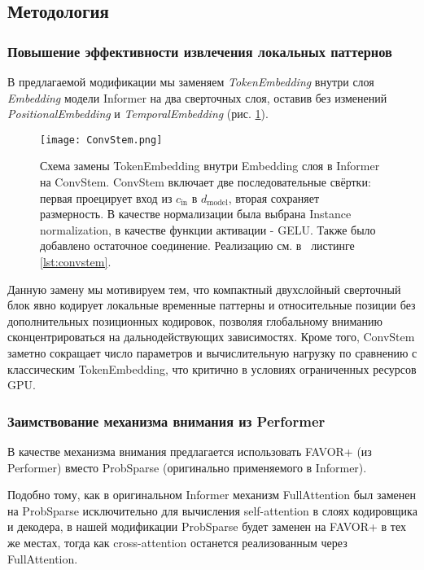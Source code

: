 \subsection{Методология}


\subsubsection{Повышение эффективности извлечения локальных паттернов}

В предлагаемой модификации мы заменяем \textit{TokenEmbedding} внутри слоя
\textit{Embedding} модели Informer на два сверточных слоя, оставив без изменений
\textit{PositionalEmbedding} и \textit{TemporalEmbedding}
(рис. \ref{fig:convstem}).

\begin{figure}[h!]
    \centering
    \texttt{[image: ConvStem.png]}
    \caption{Схема замены TokenEmbedding внутри Embedding слоя в Informer на ConvStem. 
    ConvStem включает две последовательные свёртки: первая проецирует вход из
    $c_\text{in}$ в $ d_\text{model}$, вторая сохраняет размерность. В 
    качестве нормализации была выбрана Instance normalization, в качестве функции активации 
    - GELU. Также было добавлено остаточное соединение. Реализацию см. в ~листинге~ \ref{lst:convstem}.}
    \label{fig:convstem}
\end{figure}

Данную замену мы мотивируем тем, что компактный двухслойный сверточный блок
явно кодирует локальные временные паттерны и относительные позиции без
дополнительных позиционных кодировок, позволяя глобальному вниманию
сконцентрироваться на дальнодействующих зависимостях. Кроме того, ConvStem
заметно сокращает число параметров и вычислительную нагрузку по сравнению с
классическим TokenEmbedding, что критично в условиях ограниченных ресурсов GPU.

\subsubsection{Заимствование механизма внимания из Performer}

В качестве механизма внимания предлагается использовать FAVOR+ 
(из Performer) вместо ProbSparse (оригинально применяемого в Informer).

Подобно тому, как в оригинальном Informer механизм FullAttention был заменен на 
ProbSparse исключительно для вычисления self-attention в слоях кодировщика и 
декодера, в нашей модификации ProbSparse будет заменен на FAVOR+ в тех же местах, 
тогда как cross-attention останется реализованным через FullAttention. 

